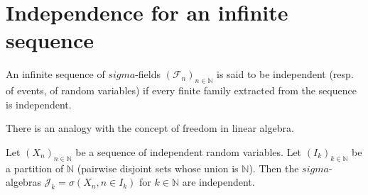 \section{Independence for an infinite sequence}%
\begin{definition}
An infinite sequence of $sigma$-fields $(\mathcal{F}_n)_{n \in \mathbb{N}}$ is said to be independent (resp. of events, of random variables) if every finite family extracted from the sequence is independent.
\end{definition}%
\begin{remark}
There is an analogy with the concept of freedom in linear algebra.
\end{remark}%
\begin{theorem}
Let $(X_n)_{n \in \mathbb{N}}$ be a sequence of independent random variables. Let $(I_k)_{k \in \mathbb{N}}$ be a partition of $\mathbb{N}$ (pairwise disjoint sets whose union is $\mathbb{N}$). Then the $sigma$-algebras $\mathcal{J}_k = \sigma(X_n, n \in I_k)$ for $k \in \mathbb{N}$ are independent.
\end{theorem}%
